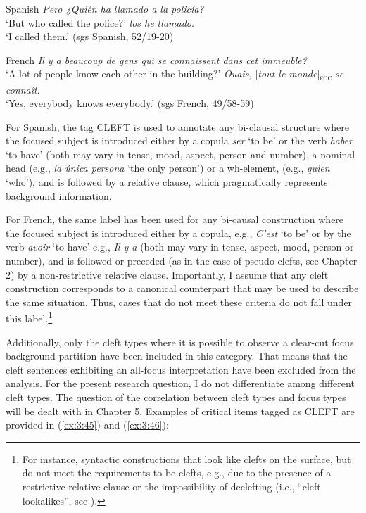\begin{description}
\ea \label{ex:3:43} Spanish
\ea \textit{Pero ¿Quién ha llamado a la policía?}\\
 ‘But who called the police?'
 \normalsize \textit{los he llamado}.\\
‘I called them.' \hfill (sgs Spanish, 52/19-20)  
\z
\z

\ea \label{ex:3:44} French
\ea  \textit{Il y a beaucoup de gens qui se connaissent dans cet immeuble?} \\
 ‘A lot of people know each other in the building?'
\ex \textit{Ouais,} [\textit{tout le monde}]\textsubscript{\textsc{foc}} \normalsize \textit{se connaît}.\\
‘Yes, everybody knows everybody.' \hfill (sgs French, 49/58-59)   
\z \z 

\item[\textbf{Cleft}:] For Spanish, the tag {\selectfont CLEFT} is used to annotate any bi-clausal structure where the focused subject is introduced either by a copula \textit{ser} `to be' or the verb \textit{haber} `to have' (both may vary in tense, mood, aspect, person and number), a nominal head (e.g., \textit{la única persona} `the only person') or a wh-element, (e.g., \textit{quien} `who'), and is followed by a relative clause, which pragmatically represents background information.

For French, the same label has been used for any bi-causal construction where the focused subject is introduced either by a copula, e.g., \textit{C'est} `to be' or by the verb \textit{avoir} `to have'  e.g., \textit{Il y a} (both may vary in tense, aspect, mood, person or number), and is followed or preceded (as in the case of pseudo clefts, see Chapter 2) by a non-restrictive relative clause.
Importantly, I assume that any cleft construction corresponds to a canonical counterpart that may be used to describe the same situation. Thus, cases that do not meet these criteria do not fall under this label.\footnote{For instance, syntactic constructions that look like clefts on the surface, but do not meet the requirements to be clefts, e.g., due to the presence of a restrictive relative clause or the impossibility of declefting (i.e., ``cleft lookalikes”, see \cite{karssenberg2017oiseaux}).}

Additionally, only the cleft types where it is possible to observe a clear-cut focus background partition have been included in this category. That means that the cleft sentences exhibiting an all-focus interpretation have been excluded from the analysis. For the present research question, I do not differentiate among different cleft types. The question of the correlation between cleft types and focus types will be dealt with in Chapter 5. Examples of critical items tagged as {\selectfont CLEFT} are provided in (\ref{ex:3:45}) and (\ref{ex:3:46}):


\end{description}

